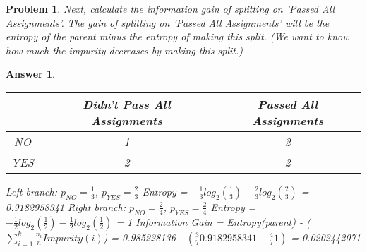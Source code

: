 \documentclass[11pt]{article}
\theoremstyle{description}
\newtheorem{problem}{Problem}
\theoremstyle{break}
\newtheorem*{answer}{Answer}
\begin{document}
    \begin{problem}
        Next, calculate the information gain of splitting on 'Passed All Assignments'.
        The gain of splitting on 'Passed All Assignments' will be the entropy of the parent minus
        the entropy of making this split.
        (We want to know how much the impurity decreases by making this split.)
    \end{problem}
    \begin{answer}
        \begin{tabular}{c|c|c}
             & Didn't Pass All Assignments & Passed All Assignments \\
            \hline
            NO & 1 & 2 \\
            YES & 2 & 2 \\
        \end{tabular}\newline
        Left branch: $p_{NO} = \frac{1}{3}$, $p_{YES} = \frac{2}{3}$\newline
        Entropy = $-\frac{1}{3}log_{2}(\frac{1}{3}) - \frac{2}{3}log_{2}(\frac{2}{3})$\newline
        = 0.9182958341\newline
        Right branch: $p_{NO} = \frac{2}{4}$, $p_{YES} = \frac{2}{4}$\newline
        Entropy = $-\frac{1}{2}log_{2}(\frac{1}{2}) - \frac{1}{2}log_{2}(\frac{1}{2})$\newline
        = 1\newline
        Information Gain = Entropy(parent) - ($\sum_{i=1}^{k} \frac{n_{i}}{n}Impurity(i)$)\newline
        = 0.985228136 - $(\frac{3}{7}0.9182958341 + \frac{4}{7}1)$\newline
        = 0.0202442071\newline
    \end{answer}
\end{document}

